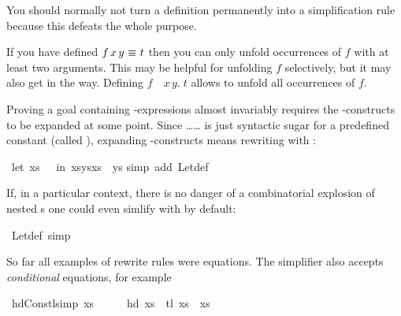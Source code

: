 \begin{isabellebody}
\begin{isamarkuptext}
You should normally not turn a definition permanently into a simplification
rule because this defeats the whole purpose.

\begin{warn}
  If you have defined $f\,x\,y~\emph{$\equiv$}~t$ then you can only unfold
  occurrences of $f$ with at least two arguments. This may be helpful for unfolding
  $f$ selectively, but it may also get in the way. Defining
  $f$~\isasymequiv~\isasymlambda$x\,y.\;t$ allows to unfold all occurrences of $f$.
\end{warn}%
\end{isamarkuptext}%
%
%
\begin{isamarkuptext}%
Proving a goal containing -expressions almost invariably
requires the -con\-structs to be expanded at some point. Since
\ldots\isa{=}\ldots{} is just syntactic sugar for a predefined constant
(called ), expanding -constructs means rewriting with
:%
\end{isamarkuptext}%
\ {\isachardoublequote}{\isacharparenleft}let\ xs\ {\isacharequal}\ {\isacharbrackleft}{\isacharbrackright}\ in\ xs{\isacharat}ys{\isacharat}xs{\isacharparenright}\ {\isacharequal}\ ys{\isachardoublequote}\isanewline
{}simp\ add{\isacharcolon}\ Let{\isacharunderscore}def{\isacharparenright}\isanewline
{}%
\begin{isamarkuptext}%
If, in a particular context, there is no danger of a combinatorial explosion
of nested s one could even simlify with  by
default:%
\end{isamarkuptext}%
\ Let{\isacharunderscore}def\ {\isacharbrackleft}simp{\isacharbrackright}%
%
\begin{isamarkuptext}%
So far all examples of rewrite rules were equations. The simplifier also
accepts \emph{conditional} equations, for example%
\end{isamarkuptext}%
\ hd{\isacharunderscore}Cons{\isacharunderscore}tl{\isacharbrackleft}simp{\isacharbrackright}{\isacharcolon}\ {\isachardoublequote}xs\ {\isasymnoteq}\ {\isacharbrackleft}{\isacharbrackright}\ \ {\isasymLongrightarrow}\ \ hd\ xs\ {\isacharhash}\ tl\ xs\ {\isacharequal}\ xs{\isachardoublequote}\isanewline

\end{isabellebody}
